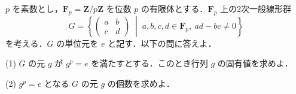 \documentclass[12pt]{jlreq}
\begin{document}

$p$ を素数とし，$\mathbf{F}_p = \mathbf{Z}/p\mathbf{Z}$ を位数 $p$ の有限体とする．$\mathbf{F}_p$ 上の2次一般線形群
\[
G = \left\{ \begin{pmatrix} a & b \\ c & d \end{pmatrix} \;\middle|\; a, b, c, d \in \mathbf{F}_p,\ ad - bc \neq 0 \right\}
\]
を考える．$G$ の単位元を $e$ と記す．以下の問に答えよ．

(1) $G$ の元 $g$ が $g^p = e$ を満たすとする．このとき行列 $g$ の固有値を求めよ．

(2) $g^p = e$ となる $G$ の元 $g$ の個数を求めよ．
\end{document}
